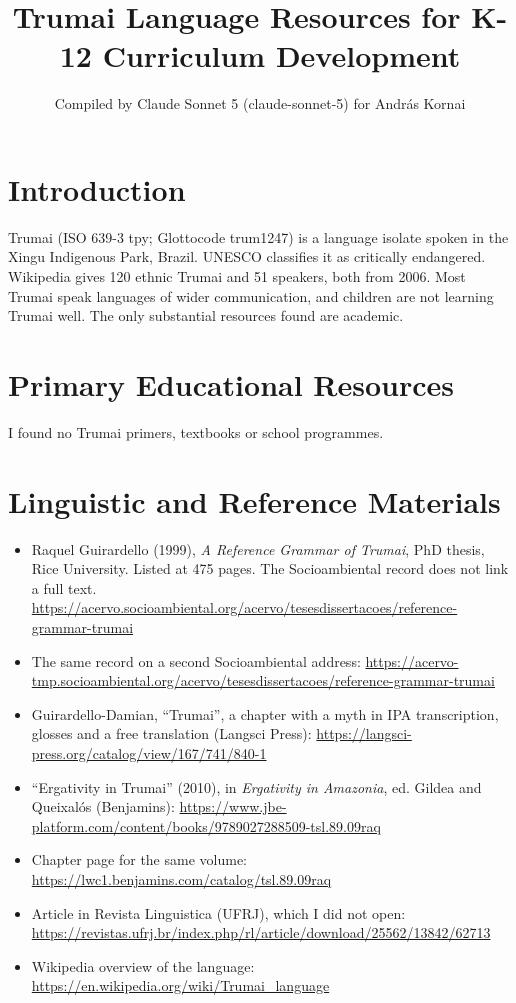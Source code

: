 \documentclass[12pt]{article}
\title{Trumai Language Resources for K-12 Curriculum Development}
\author{Compiled by Claude Sonnet 5 (claude-sonnet-5) for Andr\'as Kornai}
\date{}
\begin{document}
\maketitle

\section{Introduction}
Trumai (ISO 639-3 tpy; Glottocode trum1247) is a language isolate spoken in the Xingu Indigenous Park, Brazil. UNESCO classifies it as critically endangered. Wikipedia gives 120 ethnic Trumai and 51 speakers, both from 2006. Most Trumai speak languages of wider communication, and children are not learning Trumai well. The only substantial resources found are academic.

\section{Primary Educational Resources}
I found no Trumai primers, textbooks or school programmes.

\section{Linguistic and Reference Materials}
\begin{itemize}
\item Raquel Guirardello (1999), \emph{A Reference Grammar of Trumai}, PhD thesis, Rice University. Listed at 475 pages. The Socioambiental record does not link a full text. \url{https://acervo.socioambiental.org/acervo/tesesdissertacoes/reference-grammar-trumai}
\item The same record on a second Socioambiental address: \url{https://acervo-tmp.socioambiental.org/acervo/tesesdissertacoes/reference-grammar-trumai}
\item Guirardello-Damian, ``Trumai'', a chapter with a myth in IPA transcription, glosses and a free translation (Langsci Press): \url{https://langsci-press.org/catalog/view/167/741/840-1}
\item ``Ergativity in Trumai'' (2010), in \emph{Ergativity in Amazonia}, ed. Gildea and Queixal\'os (Benjamins): \url{https://www.jbe-platform.com/content/books/9789027288509-tsl.89.09raq}
\item Chapter page for the same volume: \url{https://lwc1.benjamins.com/catalog/tsl.89.09raq}
\item Article in Revista Linguistica (UFRJ), which I did not open: \url{https://revistas.ufrj.br/index.php/rl/article/download/25562/13842/62713}
\item Wikipedia overview of the language: \url{https://en.wikipedia.org/wiki/Trumai_language}
\end{itemize}
\end{document}

